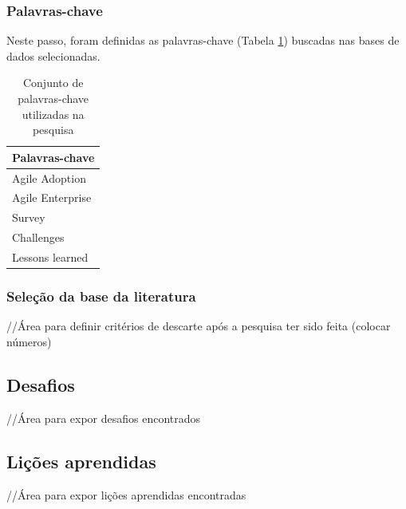 \documentclass[a4paper,11pt]{article}
\begin{document}
		\subsubsection{Palavras-chave}
			Neste passo, foram definidas as palavras-chave (Tabela \ref{tab:palavrasChave}) buscadas nas bases de dados selecionadas.
			\begin{table}[H]
				\centering
				\begin{tabular}{ | l | } \hline \textbf{Palavras-chave} \\ \hline
					Agile Adoption \\ \hline
					Agile Enterprise \\ \hline
					Survey \\ \hline
					Challenges \\ \hline
					Lessons learned \\ \hline
				\end{tabular}
				\caption{Conjunto de palavras-chave utilizadas na pesquisa}
				\label{tab:palavrasChave}
			\end{table}
		\subsubsection{Seleção da base da literatura}
			//Área para definir critérios de descarte após a pesquisa ter sido feita (colocar números)
	\subsection{Desafios}
		//Área para expor desafios encontrados
	\subsection{Lições aprendidas}
		//Área para expor lições aprendidas encontradas

\newpage


\end{document}
